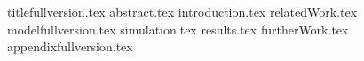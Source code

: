 \documentclass[11pt]{llncs}
\begin{document}
{titlefullversion.tex}
\thispagestyle{plain}
{abstract.tex}
{introduction.tex}
{relatedWork.tex}
{modelfullversion.tex}
{simulation.tex}
{results.tex}
{furtherWork.tex}
{appendixfullversion.tex}

\end{document}
